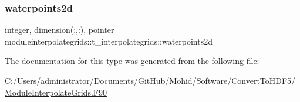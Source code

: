 \subsubsection{\texorpdfstring{waterpoints2d}{waterpoints2d}}
{\footnotesize\ttfamily integer, dimension(\+:,\+:), pointer moduleinterpolategrids\+::t\+\_\+interpolategrids\+::waterpoints2d\hspace{0.3cm}{\ttfamily [private]}}



The documentation for this type was generated from the following file\+:\begin{DoxyCompactItemize}
\item 
C\+:/\+Users/administrator/\+Documents/\+Git\+Hub/\+Mohid/\+Software/\+Convert\+To\+H\+D\+F5/\mbox{\hyperlink{_module_interpolate_grids_8_f90}{Module\+Interpolate\+Grids.\+F90}}\end{DoxyCompactItemize}
